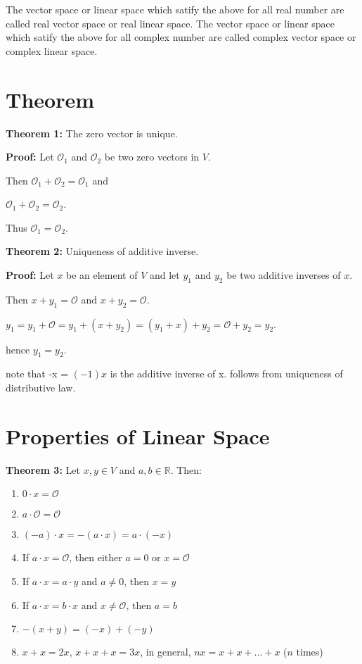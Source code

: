 \documentclass{article}
\begin{document}
The vector space or linear space which satify the above for all real number are called 
real vector space or real linear space.
The vector space or linear space which satify the above for all complex number are called
complex vector space or complex linear space.

\section{Theorem}
\textbf{Theorem 1:} The zero vector is unique. \newline

\textbf{Proof:} Let $\mathcal{O}_1$ and $\mathcal{O}_2$ be two zero vectors in $V$.

Then $\mathcal{O}_1 + \mathcal{O}_2 = \mathcal{O}_1$ and

$\mathcal{O}_1 + \mathcal{O}_2 = \mathcal{O}_2$.

Thus $\mathcal{O}_1 = \mathcal{O}_2$. \newline


\textbf{Theorem 2:} Uniqueness of additive inverse. \newline

\textbf{Proof:} Let $x$ be an element of $V$ and let $y_1$ and $y_2$ be two additive inverses of $x$.

Then $x + y_1 = \mathcal{O}$ and $x + y_2 = \mathcal{O}$.

$y_1 = y_1 + \mathcal{O} = y_1 + (x + y_2) = (y_1 + x) + y_2 = \mathcal{O} + y_2 = y_2$.

hence $y_1 = y_2$. \newline

note that -x = $(-1)x$ is the additive inverse of x. follows from uniqueness of distributive law.


\section{Properties of Linear Space}

\textbf{Theorem 3:}
Let $x, y \in V$ and $a, b \in \mathbb{R}$. Then:
\begin{enumerate}
    \item $0 \cdot x = \mathcal{O}$
    \item $a \cdot \mathcal{O} = \mathcal{O}$
    \item $(-a) \cdot x = -(a \cdot x) = a \cdot (-x)$
    \item If $a \cdot x = \mathcal{O}$, then either $a = 0$ or $x = \mathcal{O}$
    \item If $a \cdot x = a \cdot y$ and $a \neq 0$, then $x = y$
    \item If $a \cdot x = b \cdot x$ and $x \neq \mathcal{O}$, then $a = b$
    \item $-(x + y) = (-x) + (-y)$
    \item $x + x = 2x$, $x + x + x = 3x$, in general, $nx = x + x + \dots + x$ ($n$ times)
\end{enumerate}
\end{document}
